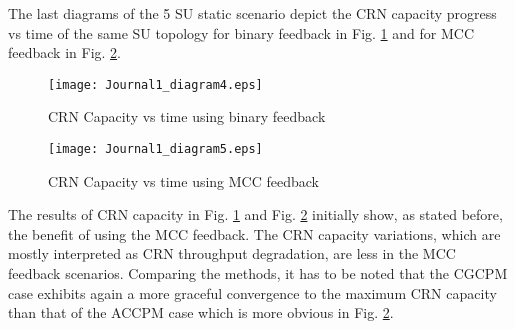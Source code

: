 \documentclass[journal]{IEEEtran}
\begin{document}
The last diagrams of the 5 SU static scenario depict the CRN capacity progress vs time of the same SU topology for binary feedback in Fig. \ref{fig6} and for MCC feedback in Fig. \ref{fig7}.
\begin{figure}[!h]
\centering
\texttt{[image: Journal1\_diagram4.eps]}
\caption{CRN Capacity vs time using binary feedback}
\label{fig6}
\end{figure}
\begin{figure}[!h]
\centering
\texttt{[image: Journal1\_diagram5.eps]}
\caption{CRN Capacity vs time using MCC feedback}
\label{fig7}
\end{figure}
The results of CRN capacity in Fig. \ref{fig6} and Fig. \ref{fig7} initially show, as stated before, the benefit of using the MCC feedback. The CRN capacity variations, which are mostly interpreted as CRN throughput degradation, are less in the MCC feedback scenarios. Comparing the methods, it has to be noted that the CGCPM case exhibits again a more graceful convergence to the maximum CRN capacity than that of the ACCPM case which is more obvious in Fig. \ref{fig7}.
\end{document}
